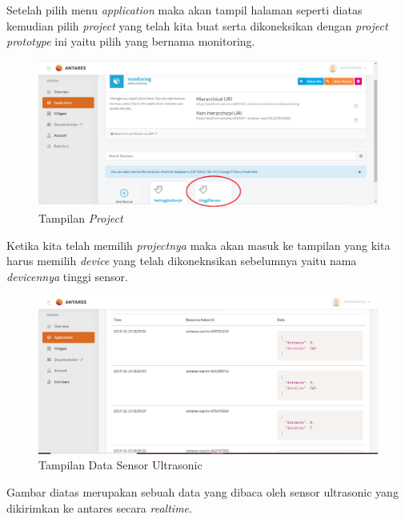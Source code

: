 \begin{enumerate}
     \par Setelah pilih menu \textit{application} maka akan tampil halaman seperti diatas kemudian pilih \textit{project} yang telah kita buat serta dikoneksikan dengan \textit{project prototype} ini yaitu pilih yang bernama monitoring.
      \begin{figure}[H]
    \centering
    \includegraphics[width=1\textwidth]{figures/data2.png}
    \caption{Tampilan \textit{Project}}
    \label{print}
    \end{figure}
     
     \par Ketika kita telah memilih \textit{projectnya} maka akan masuk ke tampilan yang kita harus memilih \textit{device} yang telah dikoneknsikan sebelumnya yaitu nama \textit{devicennya}  tinggi sensor.
      \begin{figure}[H]
    \centering
    \includegraphics[width=1\textwidth]{figures/data3.png}
    \caption{Tampilan Data Sensor Ultrasonic}
    \label{print}
    \end{figure}
    \par Gambar diatas merupakan sebuah data yang dibaca oleh sensor ultrasonic yang dikirimkan ke antares secara \textit{realtime}.
    

\end{enumerate}
